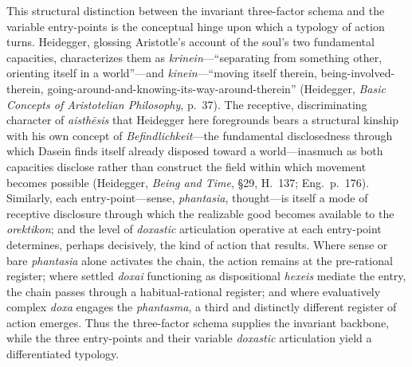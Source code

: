 \documentclass{article}
\begin{document}
This structural distinction between the invariant three-factor schema and the variable entry-points is the conceptual hinge upon which a typology of action turns. Heidegger, glossing Aristotle's account of the soul's two fundamental capacities, characterizes them as \textit{krinein}---``separating from something other, orienting itself in a world''---and \textit{kinein}---``moving itself therein, being-involved-therein, going-around-and-knowing-its-way-around-therein'' (Heidegger, \textit{Basic Concepts of Aristotelian Philosophy}, p.~37). The receptive, discriminating character of \textit{aisthēsis} that Heidegger here foregrounds bears a structural kinship with his own concept of \textit{Befindlichkeit}---the fundamental disclosedness through which Dasein finds itself already disposed toward a world---inasmuch as both capacities disclose rather than construct the field within which movement becomes possible (Heidegger, \textit{Being and Time}, \S29, H.~137; Eng.~p.~176). Similarly, each entry-point---sense, \textit{phantasia}, thought---is itself a mode of receptive disclosure through which the realizable good becomes available to the \textit{orektikon}; and the level of \textit{doxastic} articulation operative at each entry-point determines, perhaps decisively, the kind of action that results. Where sense or bare \textit{phantasia} alone activates the chain, the action remains at the pre-rational register; where settled \textit{doxai} functioning as dispositional \textit{hexeis} mediate the entry, the chain passes through a habitual-rational register; and where evaluatively complex \textit{doxa} engages the \textit{phantasma}, a third and distinctly different register of action emerges. Thus the three-factor schema supplies the invariant backbone, while the three entry-points and their variable \textit{doxastic} articulation yield a differentiated typology.


\end{document}

